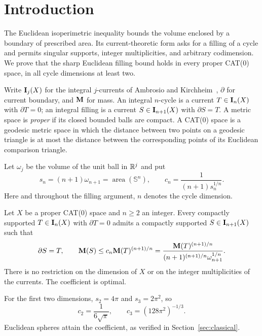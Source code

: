 \section{Introduction}\label{sec:introduction}

The Euclidean isoperimetric inequality bounds the volume enclosed by a
boundary of prescribed area. Its current-theoretic form asks for a filling
of a cycle and permits singular supports, integer multiplicities, and
arbitrary codimension. We prove that the sharp Euclidean filling bound
holds in every proper CAT(0) space, in all cycle dimensions at least two.

Write $\mathbf I_j(X)$ for the integral $j$-currents of Ambrosio and
Kirchheim~\cite{AK2000}, $\partial$ for current boundary, and $\mathbf M$
for mass. An integral $n$-cycle is a current $T\in\mathbf I_n(X)$ with
$\partial T=0$; an integral filling is a current $S\in\mathbf I_{n+1}(X)$
with $\partial S=T$. A metric space is \emph{proper} if its closed
bounded balls are compact. A CAT(0) space is a geodesic metric space in which the distance
between two points on a geodesic triangle is at most the distance between
the corresponding points of its Euclidean comparison triangle.

Let $\omega_j$ be the volume of the unit ball in $\mathbb R^j$ and put
\begin{equation}\label{eq:constants}
 s_n=(n+1)\omega_{n+1}=\operatorname{area}(\mathbb S^n),
 \qquad c_n=\frac{1}{(n+1)s_n^{1/n}}.
\end{equation}
Here and throughout the filling argument, $n$ denotes the cycle
dimension.

\begin{theorem}\label{thm:main}
Let $X$ be a proper CAT(0) space and $n\ge2$ an integer.
Every compactly supported $T\in\mathbf I_n(X)$ with $\partial T=0$ admits a
compactly supported $S\in\mathbf I_{n+1}(X)$ such that
\begin{equation}\label{eq:main}
 \partial S=T,\qquad
 \mathbf M(S)\le c_n\mathbf M(T)^{(n+1)/n}
 =\frac{\mathbf M(T)^{(n+1)/n}}
 {(n+1)^{(n+1)/n}\omega_{n+1}^{1/n}}.
\end{equation}
There is no restriction on the dimension of $X$ or on the integer
multiplicities of the currents. The coefficient is optimal.
\end{theorem}

For the first two dimensions, $s_2=4\pi$ and $s_3=2\pi^2$, so
\[
 c_2=\frac1{6\sqrt\pi},\qquad
 c_3=(128\pi^2)^{-1/3}.
\]
Euclidean spheres attain the coefficient, as verified in
Section~\ref{sec:classical}.

